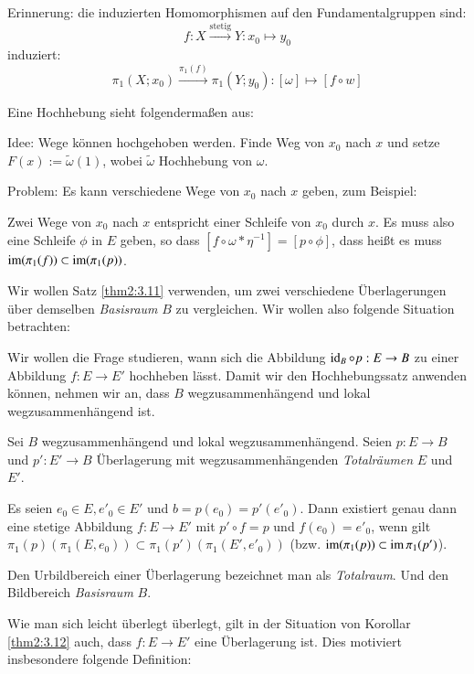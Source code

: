 \documentclass[a4paper,10pt]{scrartcl}
\begin{document}
\begin{note*}
Erinnerung: die induzierten Homomorphismen auf den Fundamentalgruppen sind:
\[
 f: X\stackrel{\text{stetig}}{\longrightarrow} Y: x_0\mapsto y_0
\]
induziert:
\[
 \pi_1(X;x_0) \stackrel{\pi_1(f)}{\longrightarrow} \pi_1(Y;y_0): [\omega] \mapsto [f\circ w]
\]
\begin{figure}[H]
\centering
 \fixme[fig86]
\caption{}
\end{figure}
Eine Hochhebung sieht folgendermaßen aus:
\begin{figure}[H]
\centering
 \fixme[fig87]
\caption{}
\end{figure}
\begin{seg}{Idee:}
 Wege können hochgehoben werden. Finde Weg von $x_0$ nach $x$ und setze $F(x):=\tilde \omega(1)$, wobei $\tilde \omega$ Hochhebung von $\omega$.
\end{seg}

\begin{seg}{Problem:}
 Es kann verschiedene Wege von $x_0$ nach $x$ geben, zum Beispiel:\\
\begin{figure}[H]
\centering
 \fixme[fig88]
\caption{}
\end{figure}
Zwei Wege von $x_0$ nach $x$ entspricht einer Schleife von $x_0$ durch $x$. Es muss also eine Schleife $\phi$ in $E$ geben, so dass $[f\circ \omega*\eta^{-1}]=[p\circ \phi]$, dass heißt es muss $\operatorname{im}(\pi_1(f))\subset \operatorname{im}(\pi_1(p))$.
\begin{figure}[H]
\centering
 \fixme[fig89]
\caption{}
\end{figure}
\end{seg}
\end{note*}
Wir wollen Satz \ref{thm2:3.11} verwenden, um zwei verschiedene Überlagerungen über demselben \emph{Basisraum} $B$ zu vergleichen. Wir wollen also folgende Situation betrachten:
\begin{figure}[H]
\centering
 \fixme[fig90]
\caption{}
\end{figure}
Wir wollen die Frage studieren, wann sich die Abbildung $\operatorname{id}_B\circ p:E\to B$ zu einer Abbildung $f:E \to E'$ hochheben lässt. Damit wir den Hochhebungssatz anwenden können, nehmen wir an, dass $B$ wegzusammenhängend und lokal wegzusammenhängend ist. 
\begin{kor}\label{thm2:3.12}
 Sei $B$ wegzusammenhängend und lokal wegzusammenhängend. Seien $p:E\to B$ und $p':E'\to B$ Überlagerung mit wegzusammenhängenden \emph{Totalräumen} $E$ und $E'$.

Es seien $e_0\in E, e'_0\in E'$ und $b=p(e_0)=p'(e'_0)$. Dann existiert genau dann eine stetige Abbildung $f:E\to E'$ mit $p'\circ f=p$ und $f(e_0)=e'_0$, wenn gilt $\pi_1(p)(\pi_1(E,e_0))\subset \pi_1(p')(\pi_1(E', e'_0))$ (bzw. $\operatorname{im}(\pi_1(p))\subset \operatorname{im} \pi_1(p')$).
\end{kor}
\begin{note*}
 Den Urbildbereich einer Überlagerung bezeichnet man als \emph{Totalraum}. Und den Bildbereich \emph{Basisraum} $B$. 
\end{note*}
Wie man sich leicht überlegt überlegt, gilt in der Situation von Korollar \ref{thm2:3.12} auch, dass $f:E\to E'$ eine Überlagerung ist. Dies motiviert insbesondere folgende Definition:
\end{document}
